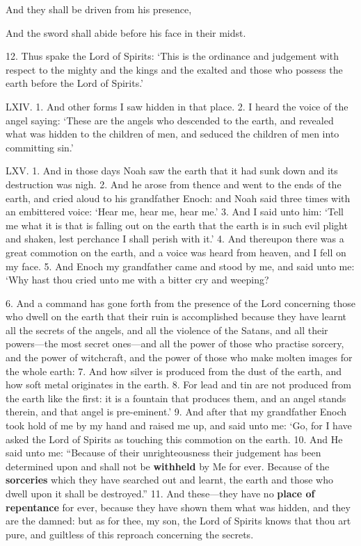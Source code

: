 And they shall be driven from his presence,

And the sword shall abide before his face in their midst.

12. Thus spake the Lord of Spirits: ‘This is the
ordinance and judgement with respect to the mighty
and the kings and the exalted and those who possess
the earth before the Lord of Spirits.’


LXIV. 1. And other forms I saw hidden in that
place. 2. I heard the voice of the angel saying:
‘These are the angels who descended to the earth,
and revealed what was hidden to the children of men,
and seduced the children of men into committing
sin.’


LXV. 1. And in those days Noah saw the earth
that it had sunk down and its destruction was nigh.
2. And he arose from thence and went to the ends of
the earth, and cried aloud to his grandfather Enoch:
and Noah said three times with an embittered voice:
‘Hear me, hear me, hear me.’ 3. And I said unto
him: ‘Tell me what it is that is falling out on the
earth that the earth is in such evil plight and shaken,
lest perchance I shall perish with it.’ 4. And thereupon
there was a great commotion on the earth, and
a voice was heard from heaven, and I fell on my face.
5. And Enoch my grandfather came and stood by
me, and said unto me: ‘Why hast thou cried unto
me with a bitter cry and weeping?

6. And a command has gone forth from the
presence of the Lord concerning those who dwell on
the earth that their ruin is accomplished because they
have learnt all the secrets of the angels, and all the
violence of the Satans, and all their powers—the most
secret ones—and all the power of those who practise
sorcery, and the power of witchcraft, and the power
of those who make molten images for the whole
earth: 7. And how silver is produced from the dust
of the earth, and how soft metal originates in the
earth. 8. For lead and tin are not produced from
the earth like the first: it is a fountain that produces
them, and an angel stands therein, and that
angel is pre-eminent.’ 9. And after that my grandfather
Enoch took hold of me by my hand and raised
me up, and said unto me: ‘Go, for I have asked the
Lord of Spirits as touching this commotion on the
earth. 10. And He said unto me: “Because of
their unrighteousness their judgement has been determined
upon and shall not be \textbf{withheld} by Me for ever.
Because of the \textbf{sorceries} which they have searched
out and learnt, the earth and those who dwell upon it
shall be destroyed.” 11. And these—they have no
\textbf{place of repentance} for ever, because they have
shown them what was hidden, and they are the
damned: but as for thee, my son, the Lord of
Spirits knows that thou art pure, and guiltless of
this reproach concerning the secrets.

